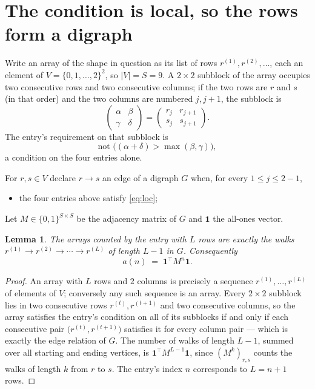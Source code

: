 \documentclass[11pt,a4paper]{article}
\theoremstyle{plain}
\newtheorem{lemma}[theorem]{Lemma}
\theoremstyle{definition}
\begin{document}
\section{The condition is local, so the rows form a digraph}

Write an array of the shape in question as its list of rows
$r^{(1)},r^{(2)},\dots$, each an element of
$V=\{0,1,\dots,2\}^{2}$, so $|V|=S=9$. A $2\times2$ subblock of the array
occupies two consecutive rows and two consecutive columns; if the two rows are $r$
and $s$ (in that order) and the two columns are numbered $j,j+1$,
the subblock is
\[
\begin{pmatrix}\alpha&\beta\\\gamma&\delta\end{pmatrix}=\begin{pmatrix}r_j&r_{j+1}\\s_j&s_{j+1}\end{pmatrix}.
\]
The entry's requirement on that subblock is
\begin{equation}\label{eq:loc}
\text{not }\bigl((\alpha+\delta)>\max(\beta,\gamma)\bigr),
\end{equation}
a condition on the four entries alone.

For $r,s\in V$ declare $r\to s$ an edge of a digraph $G$ when, for every
$1\le j\le 2-1$,
\begin{itemize}
\item the four entries above satisfy \eqref{eq:loc};

\end{itemize}
Let $M\in\{0,1\}^{S\times S}$ be the adjacency matrix of $G$ and $\mathbf{1}$ the
all-ones vector.

\begin{lemma}\label{lem:walk}
The arrays counted by the entry with $L$ rows are exactly the walks
$r^{(1)}\to r^{(2)}\to\cdots\to r^{(L)}$ of length $L-1$ in $G$. Consequently
\[
a(n)\;=\;\mathbf{1}^{\!\top}M^{n}\mathbf{1} .
\]
\end{lemma}

\begin{proof}
An array with $L$ rows and $2$ columns is precisely a sequence
$r^{(1)},\dots,r^{(L)}$ of elements of $V$; conversely any such sequence is an array.
Every $2\times2$ subblock lies in two consecutive rows $r^{(t)},r^{(t+1)}$ and two
consecutive columns, so the array satisfies the entry's condition on all of its subblocks
if and only if each consecutive pair $\bigl(r^{(t)},r^{(t+1)}\bigr)$ satisfies it for
every column pair --- which is exactly the edge relation of $G$. The number of walks of
length $L-1$, summed over all starting and ending vertices, is
$\mathbf{1}^{\!\top}M^{L-1}\mathbf{1}$, since $(M^{k})_{r,s}$ counts the walks of
length $k$ from $r$ to $s$. The entry's index $n$ corresponds to $L=n+1$ rows.
\end{proof}
\end{document}
